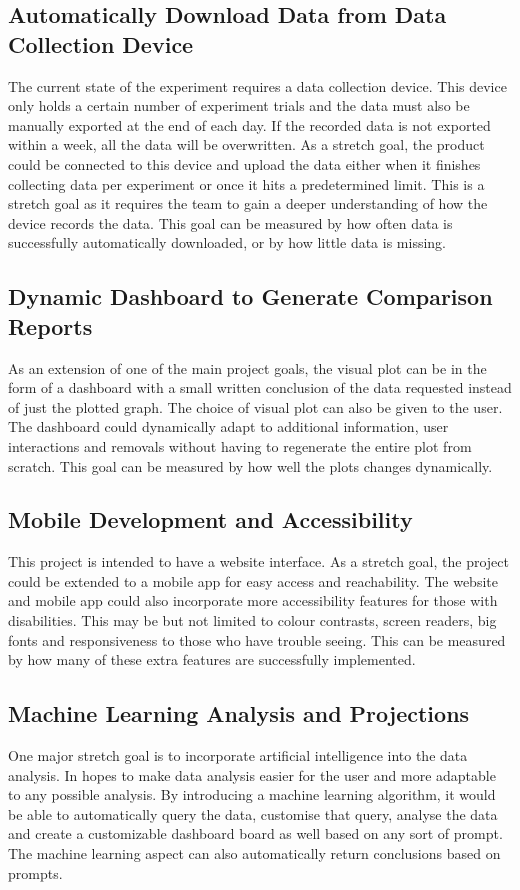 \documentclass{article}
\begin{document}
\subsection*{Automatically Download Data from Data Collection Device}
The current state of the experiment requires a data collection device. This
device only holds a certain number of experiment trials and the data must also
be manually exported at the end of each day. If the recorded data is not
exported within a week, all the data will be overwritten. As a
stretch goal, the product could be connected to this device and upload the data
either when it finishes collecting data per experiment or once it hits a predetermined limit.
This is a stretch goal as it requires the team to gain a
deeper understanding of how the device records the data. This goal can be
measured by how often data is successfully automatically downloaded, or by how
little data is missing.

\subsection*{Dynamic Dashboard to Generate Comparison Reports}
As an extension of one of the main project goals, the visual plot can be in the
form of a dashboard with a small written conclusion of the data requested
instead of just the plotted graph. The choice of visual plot can also be given
to the user. The dashboard could dynamically adapt to additional information,
user interactions and removals without having to regenerate the entire plot from
scratch. This goal can be measured by how well the plots changes dynamically.

\subsection*{Mobile Development and Accessibility}
This project is intended to have a website interface. As a stretch goal, the
project could be extended to a mobile app for easy access and reachability. The
website and mobile app could also incorporate more accessibility features for
those with disabilities. This may be but not limited to colour contrasts, screen
readers, big fonts and responsiveness to those who have trouble seeing. This can
be measured by how many of these extra features are successfully implemented.
 
\subsection*{Machine Learning Analysis and Projections}
One major stretch goal is to incorporate artificial intelligence into the data
analysis. In hopes to make data analysis easier for the user and more adaptable
to any possible analysis. By introducing a machine learning algorithm, it would
be able to automatically query the data, customise that query, analyse the data
and create a customizable dashboard board as well based on any sort of prompt.
The machine learning aspect can also automatically return conclusions based on
prompts.
\end{document}
